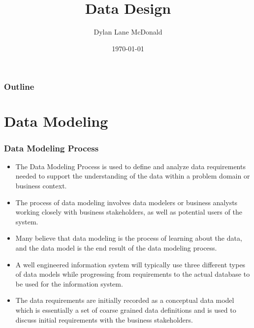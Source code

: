 \documentclass[aspectratio=169]{beamer}
\title{Data Design}
\author{Dylan Lane McDonald}
\institute{CNM STEMulus Center\\Web Development with PHP}
\date{\today}
\begin{document}
\begin{frame}
\titlepage
\end{frame}

\begin{frame}
\frametitle{Outline}
\tableofcontents
\end{frame}

\section{Data Modeling}
\begin{frame}
\frametitle{Data Modeling Process}
\begin{itemize}
	\item The Data Modeling Process is used to define and analyze data requirements needed to support the understanding of the data within a problem domain or business context.
	\item The process of data modeling involves data modelers or business analysts working closely with business stakeholders, as well as potential users of the system.
	\item Many believe that data modeling is the process of learning about the data, and the data model is the end result of the data modeling process.
	\item A well engineered information system will typically use three different types of data models while progressing from requirements to the actual database to be used for the information system.
	\item The data requirements are initially recorded as a conceptual data model which is essentially a set of coarse grained data definitions and is used to discuss initial requirements with the business stakeholders. 
\end{itemize}
\end{frame}
\end{document}
